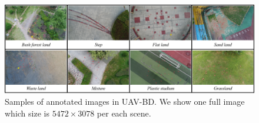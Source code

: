 

%	
%	
%	


\begin{figure}
	\includegraphics[width=\linewidth]{images/UAV-BD1.png}
	\caption{Samples of annotated images in UAV-BD. We show one full image which size is $ 5472\times 3078 $ per each scene.}
	\label{fig:dataset-original-image}
\end{figure}



